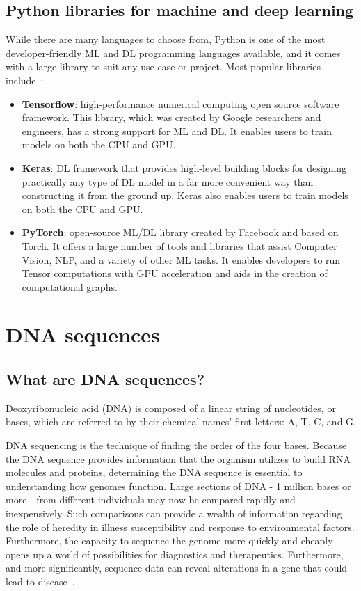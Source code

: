 \subsection{Python libraries for machine and deep learning}

While there are many languages to choose from, Python is one of the most developer-friendly \gls{ML} and \gls{DL} programming languages available, and it comes with a large library to suit any use-case or project. Most popular libraries include~\cite{JonssonWaysDevelopment,BestGeeksforGeeks}:

\begin{itemize}
    \item \textbf{Tensorflow}: high-performance numerical computing open source software framework. This library, which was created by Google researchers and engineers, has a strong support for \gls{ML} and \gls{DL}.  It enables users to train models on both the CPU and GPU.
    \item \textbf{Keras}: \gls{DL} framework that provides high-level building blocks for designing practically any type of \gls{DL} model in a far more convenient way than constructing it from the ground up. Keras also enables users to train models on both the CPU and GPU.
    \item \textbf{PyTorch}: open-source \gls{ML}/\gls{DL} library created by Facebook and based on Torch. It offers a large number of tools and libraries that assist Computer Vision, \gls{NLP}, and a variety of other \gls{ML} tasks. It enables developers to run Tensor computations with GPU acceleration and aids in the creation of computational graphs.
\end{itemize}

\section{DNA sequences} \label{sec:dna_sequences}

\subsection{What are DNA sequences?}

Deoxyribonucleic acid (DNA) is composed of a linear string of nucleotides, or bases, which are referred to by their chemical names' first letters: \gls{A}, \gls{T}, \gls{C}, and \gls{G}. 

DNA sequencing is the technique of finding the order of the four bases. Because the DNA sequence provides information that the organism utilizes to build RNA molecules and proteins, determining the DNA sequence is essential to understanding how genomes function. 
Large sections of DNA - 1 million bases or more - from different individuals may now be compared rapidly and inexpensively. Such comparisons can provide a wealth of information regarding the role of heredity in illness susceptibility and response to environmental factors. Furthermore, the capacity to sequence the genome more quickly and cheaply opens up a world of possibilities for diagnostics and therapeutics. Furthermore, and more significantly, sequence data can reveal alterations in a gene that could lead to disease~\cite{2020DNASheet}.

